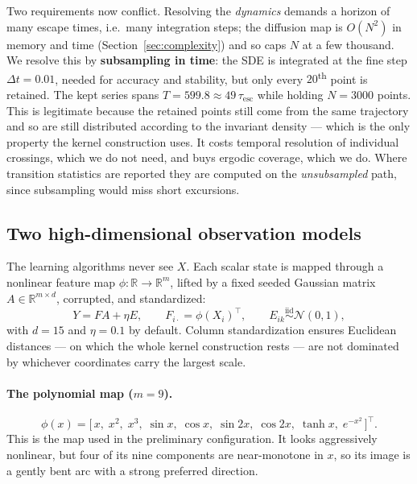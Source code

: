 \documentclass[11pt]{article}
\newcommand{\R}{\mathbb{R}}
\begin{document}
Two requirements now conflict. Resolving the \emph{dynamics} demands a horizon of
many escape times, i.e.\ many integration steps; the diffusion map is $O(N^2)$ in
memory and time (Section~\ref{sec:complexity}) and so caps $N$ at a few thousand.
We resolve this by \textbf{subsampling in time}: the SDE is integrated at the fine
step $\Delta t = 0.01$, needed for accuracy and stability, but only every
$20$\textsuperscript{th} point is retained. The kept series spans
$T = 599.8 \approx 49\,\tau_{\mathrm{esc}}$ while holding $N = 3000$ points. This
is legitimate because the retained points still come from the same trajectory and
so are still distributed according to the invariant density --- which is the only
property the kernel construction uses. It costs temporal resolution of individual
crossings, which we do not need, and buys ergodic coverage, which we do. Where
transition statistics are reported they are computed on the \emph{unsubsampled}
path, since subsampling would miss short excursions.

\subsection{Two high-dimensional observation models}
\label{sec:obs}

The learning algorithms never see $X$. Each scalar state is mapped through a
nonlinear feature map $\phi:\R\to\R^m$, lifted by a fixed seeded Gaussian matrix
$A \in \R^{m\times d}$, corrupted, and standardized:
\begin{equation}
Y = F A + \eta E ,
\qquad F_{i\cdot} = \phi(X_i)^\top ,
\qquad E_{ik}\stackrel{\text{iid}}{\sim}\mathcal{N}(0,1) ,
\label{eq:observation}
\end{equation}
with $d = 15$ and $\eta = 0.1$ by default. Column standardization ensures
Euclidean distances --- on which the whole kernel construction rests --- are not
dominated by whichever coordinates carry the largest scale.

\paragraph{The polynomial map ($m=9$).}
\begin{equation}
\phi(x) = \bigl[\,x,\;x^2,\;x^3,\;\sin x,\;\cos x,\;\sin 2x,\;\cos 2x,\;
\tanh x,\;e^{-x^2}\,\bigr]^\top .
\label{eq:featpoly}
\end{equation}
This is the map used in the preliminary configuration. It looks aggressively
nonlinear, but four of its nine components are near-monotone in $x$, so its image
is a gently bent arc with a strong preferred direction.
\end{document}
